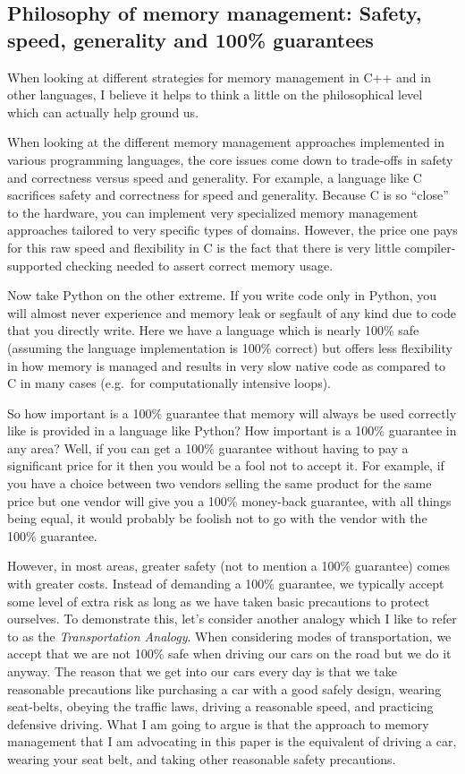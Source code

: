 \documentclass[pdf,ps2pdf,11pt]{SANDreport}
\begin{document}
%
{}\subsection{Philosophy of memory management: Safety, speed,
generality and 100\% guarantees}
\label{sec:phylosophy-of-mem-mng}
%

When looking at different strategies for memory management in C++ and
in other languages, I believe it helps to think a little on the
philosophical level which can actually help ground us.

When looking at the different memory management approaches implemented
in various programming languages, the core issues come down to trade-offs
in safety and correctness versus speed and generality.  For example, a
language like C sacrifices safety and correctness for speed and
generality.  Because C is so ``close'' to the hardware, you can
implement very specialized memory management approaches tailored to
very specific types of domains.  However, the price one pays for this
raw speed and flexibility in C is the fact that there is very little
compiler-supported checking needed to assert correct memory usage.

Now take Python on the other extreme.  If you write code only in
Python, you will almost never experience and memory leak or segfault
of any kind due to code that you directly write.  Here we have a
language which is nearly 100\% safe (assuming the language
implementation is 100\% correct) but offers less flexibility in how
memory is managed and results in very slow native code as compared to
C in many cases (e.g.\ for computationally intensive loops).

So how important is a 100\% guarantee that memory will always be used
correctly like is provided in a language like Python?  How important
is a 100\% guarantee in any area?  Well, if you can get a 100\%
guarantee without having to pay a significant price for it then you
would be a fool not to accept it.  For example, if you have a choice
between two vendors selling the same product for the same price but
one vendor will give you a 100\% money-back guarantee, with all things
being equal, it would probably be foolish not to go with the vendor
with the 100\% guarantee.

However, in most areas, greater safety (not to mention a 100\%
guarantee) comes with greater costs.  Instead of demanding a 100\%
guarantee, we typically accept some level of extra risk as long as we
have taken basic precautions to protect ourselves.  To demonstrate
this, let's consider another analogy which I like to refer to as the
{}\textit{Transportation Analogy}.  When considering modes of
transportation, we accept that we are not 100\% safe when driving our
cars on the road but we do it anyway.  The reason that we get into our
cars every day is that we take reasonable precautions like purchasing
a car with a good safely design, wearing seat-belts, obeying the
traffic laws, driving a reasonable speed, and practicing defensive
driving.  What I am going to argue is that the approach to memory
management that I am advocating in this paper is the equivalent of
driving a car, wearing your seat belt, and taking other reasonable
safety precautions.
\end{document}
